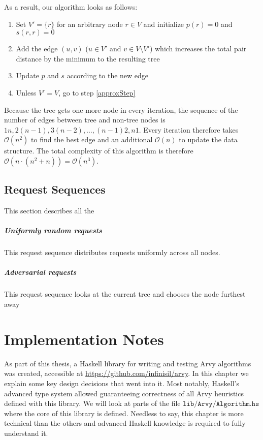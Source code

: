 \documentclass[a4paper, oneside]{discothesis}
\begin{document}
As a result, our algorithm looks as follows:
\begin{enumerate}
\item Set $V'=\{r\}$ for an arbitrary node $r\in V$ and initialize $p(r)=0$ and $s(r,r)=0$
\item Add the edge $(u,v)$ ($u\in V'$ and $v\in V\setminus V'$) which increases the total pair distance by the minimum to the resulting tree
\label{approxStep}
\item Update $p$ and $s$ according to the new edge
\item Unless $V'=V$, go to step \ref{approxStep}
\end{enumerate}

Because the tree gets one more node in every iteration, the sequence of the number of edges between tree and non-tree nodes is $1n,2(n-1),3(n-2),\dots,(n-1)2,n1$. Every iteration therefore takes $\mathcal{O}(n^2)$ to find the best edge and an additional $\mathcal{O}(n)$ to update the data structure. The total complexity of this algorithm is therefore $\mathcal{O}(n\cdot(n^2+n))=\mathcal{O}(n^3)$.


\section{Request Sequences}

This section describes all the 

\paragraph{Uniformly random requests} This request sequence distributes requests uniformly across all nodes.

\paragraph{Adversarial requests} This request sequence looks at the current tree and chooses the node furthest away

\chapter{Implementation Notes}

As part of this thesis, a Haskell library for writing and testing Arvy algorithms was created, accessible at \url{https://github.com/infinisil/arvy}. In this chapter we explain some key design decisions that went into it. Most notably, Haskell's advanced type system allowed guaranteeing correctness of all Arvy heuristics defined with this library. We will look at parts of the file \href{https://github.com/Infinisil/arvy/blob/1bdac2aa8e599372f2b058d26ec9c33fd53d7a72/lib/Arvy/Algorithm.hs}{$\texttt{lib/Arvy/Algorithm.hs}$} where the core of this library is defined. Needless to say, this chapter is more technical than the others and advanced Haskell knowledge is required to fully understand it.
\end{document}
